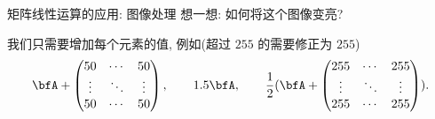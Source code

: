 \begin{frame}{矩阵线性运算的应用: 图像处理\noexer}
	\onslide<+->
	想一想: 如何将这个图像变亮?
	\onslide<+->
	\begin{center}
	\end{center}

	\onslide<+->
	我们只需要增加每个元素的值, 例如(超过 $255$ 的需要修正为 $255$)
	\[\bfA+\begin{pmatrix}
		50&\cdots&50\\
		\vdots&\ddots&\vdots\\
		50&\cdots&50
	\end{pmatrix},\qquad
	1.5\bfA,\qquad\frac12(\bfA+\begin{pmatrix}
		255&\cdots&255\\
		\vdots&\ddots&\vdots\\
		255&\cdots&255
	\end{pmatrix}).\]
\end{frame}


